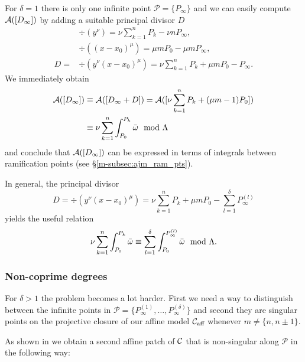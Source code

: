 \documentclass[main.tex]{subfiles}
\begin{document}
  For $\delta = 1$ there is only one infinite point $\mathcal{P} = \{ P_{\infty} \}$ and
  we can easily compute  $\mathcal{A}( [D_{\infty}] )$ by adding a suitable
  principal divisor $D$
    \begin{align*}
      &\div(y^{\nu})=  \nu \sum_{k = 1}^n P_k - \nu n P_{\infty},\\
      &\div((x-x_0)^{\mu})  =  \mu m P_0 - \mu m P_{\infty} ,\\
      D  =  & \div(y^{\nu}(x-x_0)^{\mu})  = \nu \sum_{k = 1}^n P_k + \mu m P_0 - P_{\infty}.
    \end{align*}
    We immediately obtain
    \begin{align*}
     \mathcal{A}( [D_{\infty}] )  & \equiv  \mathcal{A}([D_{\infty} + D])  =  \mathcal{A}( [ \nu \sum_{k = 1}^n P_k + (\mu m - 1) P_0 ]  ) \\ & 
      \equiv   \nu \sum_{k=1}^n \int_{P_0}^{P_k} \bar{\omega} \mod \Lambda
    \end{align*}
    and conclude that $\mathcal{A}( [D_{\infty}] )$ can be expressed in terms of integrals between
    ramification points (see \S \ref{m-subsec:ajm_ram_pts}).
  \begin{rmk}\label{rmk:sum_infty_pts}
  In general, the principal divisor
  \begin{equation*}
    D  = \div(y^{\nu}(x-x_0)^{\mu}) = \nu \sum_{k = 1}^n P_k + \mu m P_0 - \sum_{l = 1}^{\delta} P^{(l)}_{\infty}
  \end{equation*}
  yields the useful relation
  \begin{equation*}
  \nu \sum_{k=1}^n \int_{P_0}^{P_k} \bar{\omega} \equiv \sum_{l = 1}^{\delta} \int_{P_0}^{P^{(l)}_{\infty}} \bar{\omega} \mod \Lambda.
  \end{equation*}
  \end{rmk}
  
  
  
 \subsubsection{Non-coprime degrees}\label{subsec:ajm_inf_ncop}

  For $\delta > 1$ the problem becomes a lot harder. First we need a way to distinguish between the infinite points in $\mathcal{P}
  = \{ P_{\infty}^{(1)},\dots, P_{\infty}^{(\delta)} \}$ and second they are singular points
  on the projective closure of our affine model $\mathcal{C}_{\text{aff}}$
  whenever $m \ne \{n,n\pm1\}$.
  
  As shown in \cite[\S 1]{CT1996} we obtain a second affine patch of $\mathcal{C}$ that is non-singular along $\mathcal{P}$
  in the following way:
  
\end{document}
